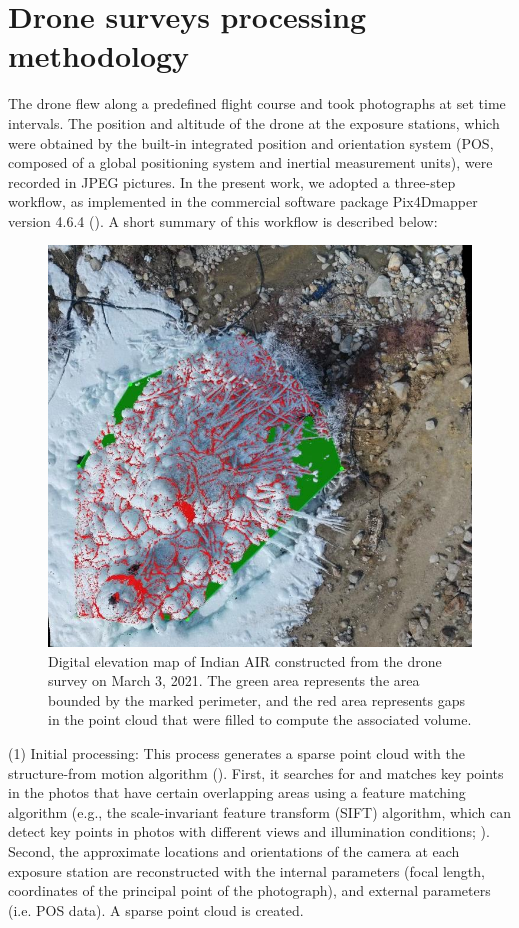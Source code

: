 \section{Drone surveys processing methodology}
\label{sec:drone_method}

The drone flew along a predefined flight course and took photographs at set time intervals. The
position and altitude of the drone at the exposure stations, which were obtained by the built-in integrated
position and orientation system (POS, composed of a global positioning system and inertial measurement units),
were recorded in JPEG pictures. In the present work, we adopted a three-step workflow, as implemented in the
commercial software package Pix4Dmapper version 4.6.4 (\cite{pix4dsaPix4DmapperUserManual2020}). A short summary of this workflow is
described below:

\begin{figure}
	\begin{center}
		\includegraphics[width=12 cm]{figs/pix4d.jpg}
	\end{center}
	\caption{Digital elevation map of Indian AIR constructed from the drone survey on March 3, 2021. The green
		area represents the area bounded by the marked perimeter, and the red area represents gaps in the point cloud
    that were filled to compute the associated volume.
	}
	\label{fig:DEM}
\end{figure}

(1) Initial processing: This process generates a sparse point cloud with the structure-from motion algorithm
(\cite{turnerAutomatedTechniqueGenerating2012}). First, it searches for and matches key points in the photos that have certain overlapping
areas using a feature matching algorithm (e.g., the scale-invariant feature transform (SIFT) algorithm, which can
detect key points in photos with different views and illumination conditions;
\cite{loweDistinctiveImageFeatures2004}). Second, the approximate locations and orientations of the camera at
each exposure station are reconstructed with the internal parameters (focal length, coordinates of the principal
point of the photograph), and external parameters (i.e. POS data). A sparse point cloud is created.

